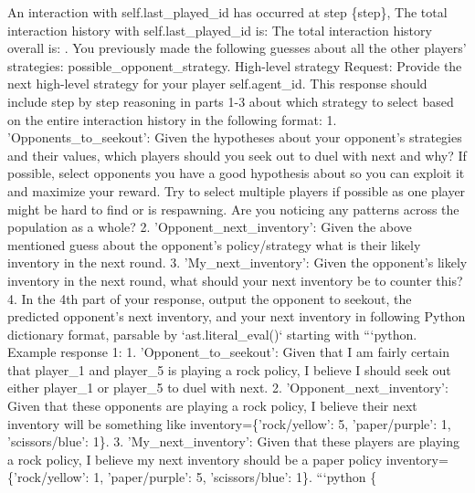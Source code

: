 \documentclass{article} %
\begin{document}
\begin{tcolorbox}[
    title={\small \textbf{ToM Module User Message 4}},
    width=\linewidth, %
    fontupper=\fontsize{9pt}{11pt}\selectfont\ttfamily %
]
An interaction with {self.last\_played\_id} has occurred at step \{step\},
The total interaction history with {self.last\_played\_id} is: 
            The total interaction history overall is: .
            You previously made the following guesses about all the other players' strategies: {possible\_opponent\_strategy}.
            High-level strategy Request:
            Provide the next high-level strategy for your player {self.agent\_id}. 
            This response should include step by step reasoning in parts 1-3 about which strategy to select based on the entire interaction history in the following format:
            1. 'Opponents\_to\_seekout': Given the hypotheses about your opponent's strategies and their values, which players should you seek out to duel with next and why? 
            If possible, select opponents you have a good hypothesis about so you can exploit it and maximize your reward. Try to select multiple players if possible as one player might be hard to find or is respawning.
            Are you noticing any patterns across the population as a whole?
            2. 'Opponent\_next\_inventory': Given the above mentioned guess about the opponent's policy/strategy what is their likely inventory in the next round.
            3. 'My\_next\_inventory': Given the opponent's likely inventory in the next round, what should your next inventory be to counter this?
            4. In the 4th part of your response, output the opponent to seekout, the predicted opponent's next inventory, and your next inventory in following Python dictionary format, parsable by `ast.literal\_eval()` starting with ```python.
            Example response 1:
            1. 'Opponent\_to\_seekout': Given that I am fairly certain that player\_1 and player\_5 is playing a rock policy, I believe I should seek out either player\_1 or player\_5 to duel with next.
            2. 'Opponent\_next\_inventory': Given that these opponents are playing a rock policy, I believe their next inventory will be something like inventory=\{'rock/yellow': 5, 'paper/purple': 1, 'scissors/blue': 1\}.
            3. 'My\_next\_inventory': Given that these players are playing a rock policy, I believe my next inventory should be a paper policy inventory=\{'rock/yellow': 1, 'paper/purple': 5, 'scissors/blue': 1\}.
            ```python
            \{

\end{tcolorbox}
\end{document}
